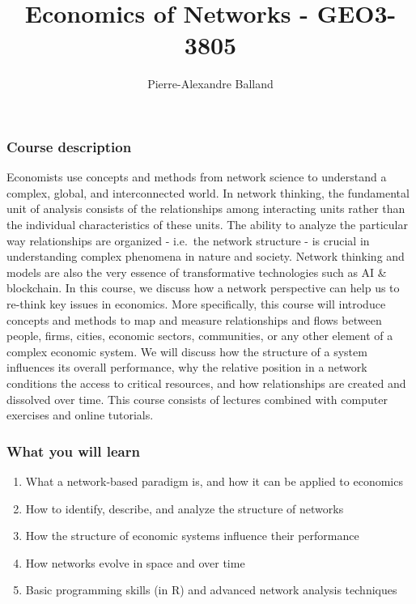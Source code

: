\documentclass[
]{article}
\title{Economics of Networks - GEO3-3805}
\author{Pierre-Alexandre Balland}
\date{}
\providecommand{\tightlist}{%
  \setlength{\itemsep}{0pt}\setlength{\parskip}{0pt}}
\begin{document}
\maketitle

\hypertarget{course-description}{%
\subsubsection{Course description}\label{course-description}}

Economists use concepts and methods from network science to understand a
complex, global, and interconnected world. In network thinking, the
fundamental unit of analysis consists of the relationships among
interacting units rather than the individual characteristics of these
units. The ability to analyze the particular way relationships are
organized - i.e.~the network structure - is crucial in understanding
complex phenomena in nature and society. Network thinking and models are
also the very essence of transformative technologies such as AI \&
blockchain. In this course, we discuss how a network perspective can
help us to re-think key issues in economics. More specifically, this
course will introduce concepts and methods to map and measure
relationships and flows between people, firms, cities, economic sectors,
communities, or any other element of a complex economic system. We will
discuss how the structure of a system influences its overall
performance, why the relative position in a network conditions the
access to critical resources, and how relationships are created and
dissolved over time. This course consists of lectures combined with
computer exercises and online tutorials.

\hypertarget{what-you-will-learn}{%
\subsubsection{What you will learn}\label{what-you-will-learn}}

\begin{enumerate}
\def\labelenumi{\arabic{enumi}.}
\tightlist
\item
  What a network-based paradigm is, and how it can be applied to
  economics
\item
  How to identify, describe, and analyze the structure of networks
\item
  How the structure of economic systems influence their performance
\item
  How networks evolve in space and over time
\item
  Basic programming skills (in R) and advanced network analysis
  techniques
\end{enumerate}
\end{document}
